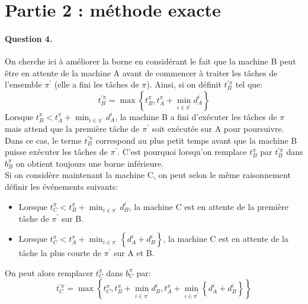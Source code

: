 \documentclass[a4paper, 10pt]{article}
\begin{document}
	\section*{Partie 2 : méthode exacte}
		
		\paragraph{Question 4.}{On cherche ici à améliorer la borne en considérant le fait que la machine B peut être en attente de la machine A avant de commencer à traiter les tâches de l'ensemble $\pi^\prime$ (elle a fini les tâches de $\pi$). Ainsi, si on définit $t^{\prime\pi}_B$ tel que:
		\begin{equation*}
			t^{\prime\pi}_B = \max \left\{ t^{\pi}_B, t^{\pi}_A + \min_{i \in \pi^\prime} d^i_A \right\}
		\end{equation*}
		Lorsque $t^{\pi}_B < t^{\pi}_A + \min_{i \in \pi^\prime} d^i_A$, la machine B a fini d'exécuter les tâches de $\pi$ mais attend que la première tâche de $\pi^\prime$ soit exécutée sur A pour poursuivre. Dans ce cas, le terme $t^{\prime\pi}_B$ correspond au plus petit temps avant que la machine B puisse exécuter les tâches de $\pi^\prime$. C'est pourquoi lorsqu'on remplace $t^\pi_B$ par $t^{\prime\pi}_B$ dans $b^\pi_B$ on obtient toujours une borne inférieure.\\
		
		Si on considère maintenant la machine C, on peut selon le même raisonnement définir les événements suivants:
		\begin{itemize}
			\item Lorsque $t^{\pi}_C < t^{\pi}_B + \min_{i \in \pi^\prime} d^i_B$, la machine C est en attente de la première tâche de $\pi^\prime$ sur B.
			\item Lorsque $t^\pi_C < t^\pi_A + \min_{i \in \pi^\prime} \left\{ d^i_A + d^i_B \right\}$, la machine C est en attente de la tâche la plus courte de $\pi^\prime$ sur A et B.
		\end{itemize}
		
		On peut alors remplacer $t^\pi_C$ dans $b^\pi_C$ par:
		\begin{equation*}
			t^{\prime\pi}_C = \max \left\{ t^{\pi}_C, t^{\pi}_B + \min_{i \in \pi^\prime} d^i_B,  t^\pi_A + \min_{i \in \pi^\prime} \left\{ d^i_A + d^i_B \right\} \right\}
		\end{equation*}
		}
		
\end{document}
